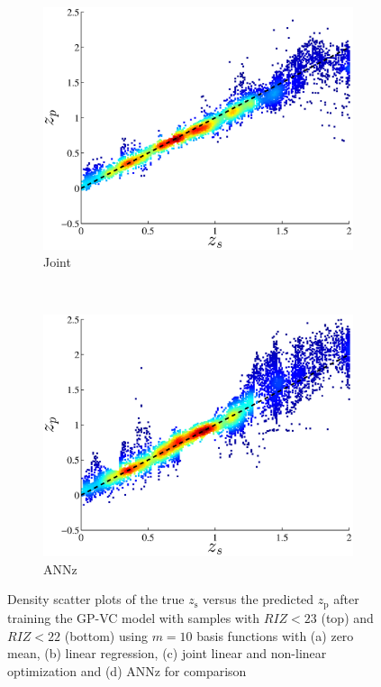 \documentclass[useAMS,usenatbib,fleqn]{mn2e}
\begin{document}
\begin{figure}
\begin{subfigure}[b]{0.24\textwidth}
                \includegraphics[width=\textwidth]{figures/22_J.eps}
                \caption{Joint}
        \end{subfigure}
       ~
        \begin{subfigure}[b]{0.24\textwidth}
                \includegraphics[width=\textwidth]{figures/ANN_22.eps}
                \caption{{\sc ANNz}}
        \end{subfigure}
        
        \caption{Density scatter plots of the true $z_\textrm{s}$ versus the predicted $z_\textrm{p}$ after training the GP-VC model with samples with $RIZ<23$ (top) and $RIZ<22$ (bottom) using $m=10$ basis functions with (a) zero mean, (b) linear regression, (c) joint linear and non-linear optimization and (d) {\sc ANNz} for comparison}
        \label{fig-RIZ-splits}
\end{figure}
\end{document}
